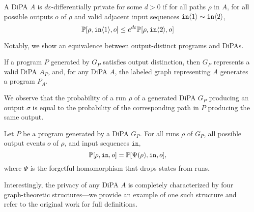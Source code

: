 \begin{defn}
    A DiPA $A$ is $d\varepsilon$-differentially private for some $d>0$ if for all paths $\rho$ in $A$, for all possible outputs $o$ of $\rho$ and valid adjacent input sequences $\texttt{in}\langle1 \rangle\sim \texttt{in}\langle2 \rangle$, \[
        \mathbb{P}[\rho, \texttt{in}\langle1 \rangle, o]\leq e^{d\varepsilon} \mathbb{P}[\rho, \texttt{in}\langle2 \rangle, o]
    \]
\end{defn}

Notably, we show an equivalence between output-distinct programs and DiPAs.

\begin{prop}
    If a program $P$ generated by $G_P$ satisfies output distinction, then $G_P$ represents a valid DiPA $A_P$, and, for any DiPA $A$, the labeled graph representing $A$ generates a program $P_A$. 
\end{prop}

We observe that the probability of a run $\rho$ of a generated DiPA $G_P$ producing an output $\sigma$ is equal to the probability of the corresponding path in $P$ producing the same output. 

\begin{prop}
    Let $P$ be a program generated by a DiPA $G_P$. For all runs $\rho$ of $G_P$, all possible output events $o$ of $\rho$, and input sequences $\texttt{in}$, \[
        \mathbb{P}[\rho, \texttt{in}, o]=\mathbb{P}[\Psi(\rho), \texttt{in}, o],
    \]
    where $\Psi$ is the forgetful homomorphism that drops states from runs. 
\end{prop}

Interestingly, the privacy of any DiPA $A$ is completely characterized by four graph-theoretic structures---we provide an example of one such structure and refer to the original work for full definitions.

